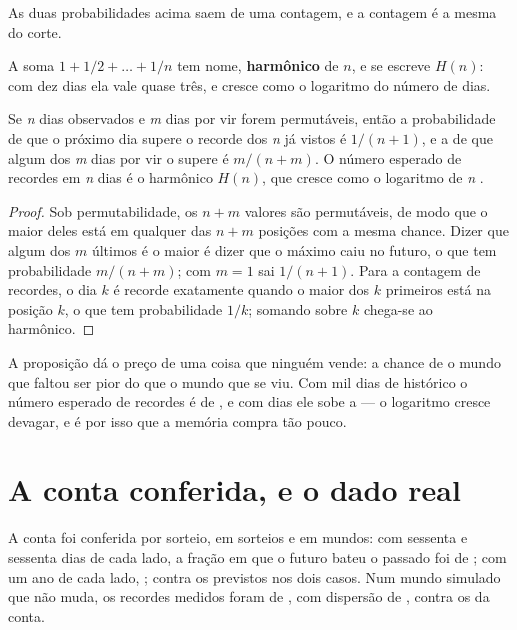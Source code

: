 As duas probabilidades acima saem de uma contagem, e a contagem é a mesma do corte.

A soma $1 + 1/2 + \dots + 1/n$ tem nome, \textbf{harmônico} de $n$, e se escreve $H(n)$: com dez
dias ela vale quase três, e cresce como o logaritmo do número de dias.

\begin{proposicao}\label{prop:recorde}
Se \emph{n} dias observados e \emph{m} dias por vir forem permutáveis, então a probabilidade de que
o próximo dia supere o recorde dos \emph{n} já vistos é $1/(n+1)$, e a de que algum dos \emph{m}
dias por vir o supere é $m/(n+m)$. O número esperado de recordes em \emph{n} dias é o harmônico
$H(n)$, que cresce como o logaritmo de \emph{n} \cite{arnold1998records}.
\end{proposicao}

\begin{proof}
Sob permutabilidade, os $n+m$ valores são permutáveis, de modo que o maior deles está em qualquer
das $n+m$ posições com a mesma chance. Dizer que algum dos $m$ últimos é o maior é dizer que o
máximo caiu no futuro, o que tem probabilidade $m/(n+m)$; com $m=1$ sai $1/(n+1)$. Para a contagem
de recordes, o dia $k$ é recorde exatamente quando o maior dos $k$ primeiros está na posição $k$,
o que tem probabilidade $1/k$; somando sobre $k$ chega-se ao harmônico.
\end{proof}

A proposição dá o preço de uma coisa que ninguém vende: a chance de o mundo que faltou ser pior do
que o mundo que se viu. Com mil dias de histórico o número esperado de recordes é de \numRecordeEsperadoMil{}, e com
\numRecordeDiasPorMundo{} dias ele sobe a \numRecordeEsperadoMundo{} --- o
logaritmo cresce devagar, e é por isso que a memória compra tão pouco.

\section{A conta conferida, e o dado real}

A conta foi conferida por sorteio, em \numRecordeSorteios{} sorteios e em \numRecordeSementes{}
mundos: com sessenta e sessenta dias de cada lado, a fração em que o futuro bateu o passado foi de
\numRecordeMedidoSessenta{}; com um ano de cada lado, \numRecordeMedidoAno{}; contra os
\numRecordeProbabilidade{} previstos nos dois casos. Num mundo simulado que não muda, os recordes
medidos foram de \numRecordeParado{}, com dispersão de \numRecordeParadoDispersao{}, contra os
\numRecordeEsperadoMundo{} da conta.

